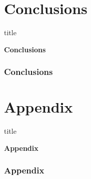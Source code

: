 \documentclass[11pt]{beamer}
\begin{document}
\section[Conclusions]{Conclusions}
\begin{frame}
	\begin{beamercolorbox}{title}
		\begin{center}
			\bfseries \huge Conclusions
		\end{center}	
	\end{beamercolorbox}
	
\end{frame}

\begin{frame}

	\frametitle{\bfseries Conclusions}
\end{frame}

\section[Appendix]{Appendix}
\begin{frame}
	\begin{beamercolorbox}{title}
		\begin{center}
			\bfseries \huge Appendix
		\end{center}	
	\end{beamercolorbox}
	
\end{frame}

\begin{frame}
	
	\frametitle{\bfseries Appendix}
\end{frame}
\end{document}
